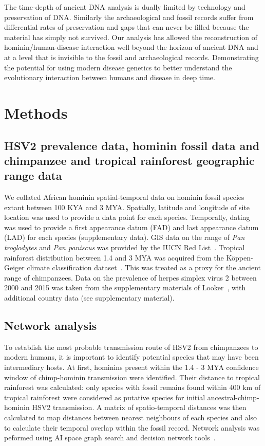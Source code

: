 \documentclass[fleqn,10pt]{wlscirep}
\begin{document}
The time-depth of ancient DNA analysis is dually limited by technology and preservation of DNA. Similarly the archaeological and fossil records suffer from differential rates of preservation and gaps that can never be filled because the material has simply not survived.  Our analysis has allowed the reconstruction of hominin/human-disease interaction well beyond the horizon of ancient DNA and at a level that is invisible to the fossil and archaeological records. Demonstrating the potential for using modern disease genetics to better understand the evolutionary interaction between humans and disease in deep time.

\section*{Methods}
\subsection*{HSV2 prevalence data, hominin fossil data and chimpanzee and tropical rainforest geographic range data}

We collated African hominin spatial-temporal data on hominin fossil species extant between 100 KYA and 3 MYA. Spatially, latitude and longitude of site location was used to provide a data point for each species. Temporally, dating was used to provide a first appearance datum (FAD) and last appearance datum (LAD) for each species (supplementary data). GIS data on the range of \textit{Pan troglodytes} and \textit{Pan paniscus} was provided by the IUCN Red List~\cite{Oates2008}. Tropical rainforest distribution between 1.4 and 3 MYA was acquired from the K\"{o}ppen-Geiger climate classification dataset~\cite{Peel2007}. This was treated as a proxy for the ancient range of chimpanzees. Data on the prevalence of herpes simplex virus 2 between 2000 and 2015 was taken from the supplementary materials of Looker~\cite{Looker2015}, with additional country data (see supplementary material). 

\subsection*{Network analysis}

To establish the most probable transmission route of HSV2 from chimpanzees to modern humans, it is important to identify potential species that may have been intermediary hosts. At first, hominins present within the 1.4 - 3 MYA confidence window of chimp-hominin transmission were identified. Their distance to tropical rainforest was calculated: only species with fossil remains found within 400 km of tropical rainforest were considered as putative species for initial ancestral-chimp-hominin HSV2 transmission. A matrix of spatio-temporal distances was then calculated to map distances between nearest neighbours of each species and also to calculate their temporal overlap within the fossil record. Network analysis was peformed using AI space graph search and decision network tools~\cite{poole2010artificial}.
\end{document}
